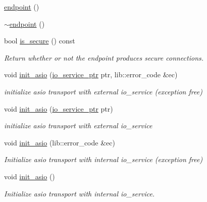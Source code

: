 \begin{DoxyCompactItemize}
\item 
\hyperlink{classwebsocketpp_1_1transport_1_1asio_1_1endpoint_a4da0f956f7962c68230676aa1e19e96d}{endpoint} ()
\item 
\hyperlink{classwebsocketpp_1_1transport_1_1asio_1_1endpoint_af592c05982766c07c9b676d49bd9e4b6}{$\sim$endpoint} ()
\item 
bool \hyperlink{classwebsocketpp_1_1transport_1_1asio_1_1endpoint_acab111d99331befd6c2ee2d557193521}{is\+\_\+secure} () const 
\begin{DoxyCompactList}\small\item\em Return whether or not the endpoint produces secure connections. \end{DoxyCompactList}\item 
void \hyperlink{classwebsocketpp_1_1transport_1_1asio_1_1endpoint_a67da637106d3cfb40078b477e2579a13}{init\+\_\+asio} (\hyperlink{classwebsocketpp_1_1transport_1_1asio_1_1endpoint_acc7e89c6427514628f551cf3f795b7e0}{io\+\_\+service\+\_\+ptr} ptr, lib\+::error\+\_\+code \&ec)
\begin{DoxyCompactList}\small\item\em initialize asio transport with external io\+\_\+service (exception free) \end{DoxyCompactList}\item 
void \hyperlink{classwebsocketpp_1_1transport_1_1asio_1_1endpoint_a320fc4ea3a151afaf8b973ce32effd25}{init\+\_\+asio} (\hyperlink{classwebsocketpp_1_1transport_1_1asio_1_1endpoint_acc7e89c6427514628f551cf3f795b7e0}{io\+\_\+service\+\_\+ptr} ptr)
\begin{DoxyCompactList}\small\item\em initialize asio transport with external io\+\_\+service \end{DoxyCompactList}\item 
void \hyperlink{classwebsocketpp_1_1transport_1_1asio_1_1endpoint_a7b4249fd3e2663323ac29ef7935278de}{init\+\_\+asio} (lib\+::error\+\_\+code \&ec)
\begin{DoxyCompactList}\small\item\em Initialize asio transport with internal io\+\_\+service (exception free) \end{DoxyCompactList}\item 
void \hyperlink{classwebsocketpp_1_1transport_1_1asio_1_1endpoint_a22938eec899a9ab2b9ada2b76172f798}{init\+\_\+asio} ()
\begin{DoxyCompactList}\small\item\em Initialize asio transport with internal io\+\_\+service. \end{DoxyCompactList}\item 

\end{DoxyCompactItemize}
